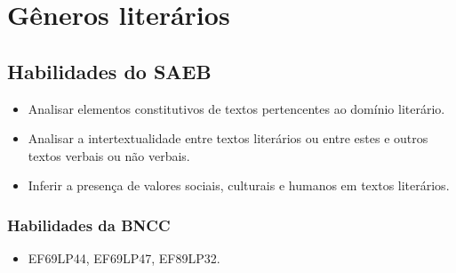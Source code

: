 \chapter{Gêneros literários}

\section{Habilidades do SAEB} 

\begin{itemize}
  \item
Analisar elementos constitutivos de
textos pertencentes ao domínio literário.
\item Analisar a intertextualidade
entre textos literários ou entre estes e outros textos verbais ou não
verbais.
\item Inferir a presença de valores sociais, culturais e humanos em
textos literários.
\end{itemize}

\subsection{Habilidades da BNCC}

\begin{itemize}
\tightlist
\item
  EF69LP44, EF69LP47, EF89LP32.
\end{itemize}


